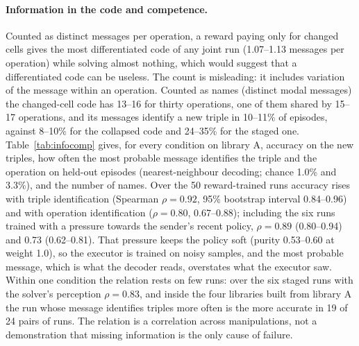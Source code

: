 \documentclass[11pt]{article}
\begin{document}
\begin{table}[h]\centering\small
\caption{Name turnover (fraction of the thirty single operations whose modal message changed between
evaluations 500 steps apart, averaged after step 16\,000), purity and accuracy, two seeds per arm.}\label{tab:stability}
\end{table}

\paragraph{Information in the code and competence.} Counted as distinct messages per operation, a reward paying only
for changed cells gives the most differentiated code of any joint run (1.07--1.13 messages per operation) while
solving almost nothing, which would suggest that a differentiated code can be useless. The count is misleading: it
includes variation of the message within an operation. Counted as names (distinct modal messages) the changed-cell
code has 13--16 for thirty operations, one of them shared by 15--17 operations, and its messages identify a new
triple in 10--11\% of episodes, against 8--10\% for the collapsed code and 24--35\% for the staged one.
Table~\ref{tab:infocomp} gives, for every condition on library A, accuracy on the new triples, how often the most
probable message identifies the triple and the operation on held-out episodes (nearest-neighbour decoding; chance
1.0\% and 3.3\%), and the number of names. Over the 50 reward-trained runs accuracy rises with triple identification
(Spearman $\rho = 0.92$, 95\% bootstrap interval 0.84--0.96) and with operation identification ($\rho = 0.80$,
0.67--0.88); including the six runs trained with a pressure towards the sender's recent policy, $\rho = 0.89$
(0.80--0.94) and 0.73 (0.62--0.81). That pressure keeps the policy soft (purity 0.53--0.60 at weight 1.0), so the
executor is trained on noisy samples, and the most probable message, which is what the decoder reads, overstates
what the executor saw. Within one condition the relation rests on few runs: over the six staged runs with the solver's
perception $\rho = 0.83$, and inside the four libraries built from library A the run whose message identifies
triples more often is the more accurate in 19 of 24 pairs of runs. The relation is a correlation across
manipulations, not a demonstration that missing information is the only cause of failure.

\begin{table}[h]\centering\small\resizebox{\textwidth}{!}{}
\caption{Competence and information in the code, library A, self-supervised perception unless stated: range
over runs of exact match on the new triples, of how often the most probable message identifies the triple (ten
episodes per triple) and the operation (twenty episodes per single operation) on held-out episodes, and of the
number of names for the thirty single operations. Joint experience includes two runs of the
same configuration from the stability experiment.}\label{tab:infocomp}
\end{table}
\end{document}
